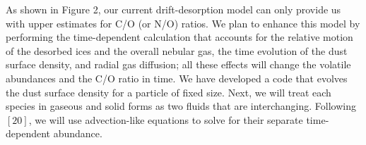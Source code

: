 \documentclass[12pt, letterpaper]{article}
\begin{document}
As shown in Figure 2, our current drift-desorption model can only provide us with upper estimates for C/O (or N/O) ratios. We plan to enhance this model by performing the time-dependent calculation that accounts for the relative motion of the desorbed ices and the overall nebular gas, the time evolution of the dust surface density,  and radial gas diffusion; all these effects will change the volatile abundances and the C/O ratio in time. We have developed a code that evolves the dust surface density for a particle of fixed size. Next, we will treat  each species in gaseous and solid forms as two fluids that are interchanging. Following $[20]$, we will use advection-like equations to solve for their separate time-dependent abundance.





%

\footnotesize
\end{document}
